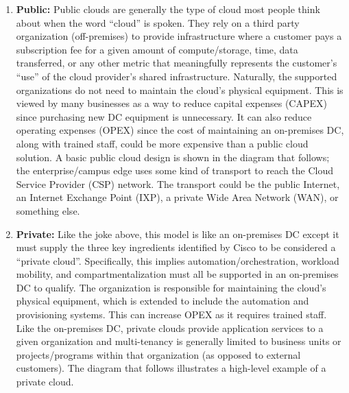 \begin{enumerate}
  \item \textbf{Public:} Public clouds are generally the type of cloud most people think
  about when the word ``cloud'' is spoken. They rely on a third party organization
  (off-premises) to provide infrastructure where a customer pays a subscription
  fee for a given amount of compute/storage, time, data transferred, or any
  other metric that meaningfully represents the customer’s ``use'' of the cloud
  provider’s shared infrastructure. Naturally, the supported organizations do
  not need to maintain the cloud’s physical equipment. This is viewed by many
  businesses as a way to reduce capital expenses (CAPEX) since purchasing new
  DC equipment is unnecessary. It can also reduce operating expenses (OPEX)
  since the cost of maintaining an on-premises DC, along with trained staff,
  could be more expensive than a public cloud solution. A basic public cloud
  design is shown in the diagram that follows; the enterprise/campus edge uses some
  kind of transport to reach the Cloud Service Provider (CSP) network. The
  transport could be the public Internet, an Internet Exchange Point (IXP),
  a private Wide Area Network (WAN), or something else.


  \item \textbf{Private:} Like the joke above, this model is like an on-premises
  DC except it must supply the three key ingredients identified by Cisco to be
  considered a ``private cloud''. Specifically, this implies
  automation/orchestration, workload mobility, and compartmentalization must
  all be supported in an on-premises DC to qualify. The organization is
  responsible for maintaining the cloud’s physical equipment, which is
  extended to include the automation and provisioning systems. This can
  increase OPEX as it requires trained staff. Like the on-premises DC, private
  clouds provide application services to a given organization and
  multi-tenancy is generally limited to business units or projects/programs
  within that organization (as opposed to external customers). The diagram
  that follows illustrates a high-level example of a private cloud.



\end{enumerate}
